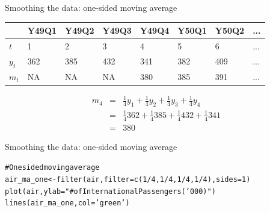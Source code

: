 \documentclass{beamer}\usepackage[]{graphicx}\usepackage[]{color}
\makeatletter
\newcommand{\hlnum}[1]{\textcolor[rgb]{0.824,0.412,0.118}{#1}}%
\newcommand{\hlstr}[1]{\textcolor[rgb]{1,0.894,0.71}{#1}}%
\newcommand{\hlcom}[1]{\textcolor[rgb]{0.824,0.706,0.549}{#1}}%
\newcommand{\hlopt}[1]{\textcolor[rgb]{1,0.894,0.769}{#1}}%
\newcommand{\hlstd}[1]{\textcolor[rgb]{1,0.894,0.769}{#1}}%
\newcommand{\hlkwb}[1]{\textcolor[rgb]{0.804,0.776,0.451}{#1}}%
\newcommand{\hlkwc}[1]{\textcolor[rgb]{0.78,0.941,0.545}{#1}}%
\newcommand{\hlkwd}[1]{\textcolor[rgb]{1,0.78,0.769}{#1}}%
\newenvironment{kframe}{%
 \def\at@end@of@kframe{}%
 \ifinner\ifhmode%
  \def\at@end@of@kframe{\end{minipage}}%
  \begin{minipage}{\columnwidth}%
 \fi\fi%
 \def\FrameCommand##1{\hskip\@totalleftmargin \hskip-\fboxsep
 \colorbox{shadecolor}{##1}\hskip-\fboxsep
     \hskip-\linewidth \hskip-\@totalleftmargin \hskip\columnwidth}%
 \MakeFramed {\advance\hsize-\width
   \@totalleftmargin\z@ \linewidth\hsize
   \@setminipage}}%
 {\par\unskip\endMakeFramed%
 \at@end@of@kframe}
\newenvironment{knitrout}{}{} %
\makeatother
\begin{document}
\begin{darkframes}
    \begin{frame}[fragile]{Smoothing the data: one-sided moving average}
      \fontsize{9}{9}\selectfont
      \begin{center}
          \begin{tabular}{llllllll}
          \hline
            & Y49Q1 & Y49Q2 & Y49Q3 & Y49Q4 & Y50Q1 & Y50Q2 & ... \\
          \hline
           $t$ & 1  &	2 &	3 &	4 &	5 &	6 & ... \\
          $y_t$ & 362 &	385 &	432 &	341 &	382 &	409 & ... \\
          $m_t$ & NA &	NA &	NA &	380	& 385	& 391 & ... \\
            \hline 
        \end{tabular}
      \end{center} \pause
      
      \begin{center}
        \begin{eqnarray*}
          m_4 &=& \frac{1}{4} y_{1} + \frac{1}{4} y_{2} + \frac{1}{4} y_{3} + \frac{1}{4} y_{4} \\
          &=& \frac{1}{4} 362 + \frac{1}{4} 385 + \frac{1}{4} 432 + \frac{1}{4} 341 \\
          &=& 380
        \end{eqnarray*}
      \end{center} 
      
    \end{frame}
    
    
    

    \begin{frame}[fragile]{Smoothing the data: one-sided moving average}
      \fontsize{8}{8}\selectfont
  
\begin{knitrout}
\begin{kframe}
\begin{alltt}
\hlcom{# One sided moving average}
\hlstd{air_ma_one} \hlkwb{<-} \hlkwd{filter}\hlstd{(air,} \hlkwc{filter}\hlstd{=}\hlkwd{c}\hlstd{(}\hlnum{1}\hlopt{/}\hlnum{4}\hlstd{,}\hlnum{1}\hlopt{/}\hlnum{4}\hlstd{,}\hlnum{1}\hlopt{/}\hlnum{4}\hlstd{,}\hlnum{1}\hlopt{/}\hlnum{4}\hlstd{),} \hlkwc{sides}\hlstd{=}\hlnum{1}\hlstd{)}
\hlkwd{plot}\hlstd{(air,} \hlkwc{ylab}\hlstd{=}\hlstr{"# of International Passengers ('000)"}\hlstd{)}
\hlkwd{lines}\hlstd{(air_ma_one,} \hlkwc{col}\hlstd{=}\hlstr{'green'}\hlstd{)}
\end{alltt}
\end{kframe}



\end{knitrout}
\end{frame}
\end{darkframes}
\end{document}
